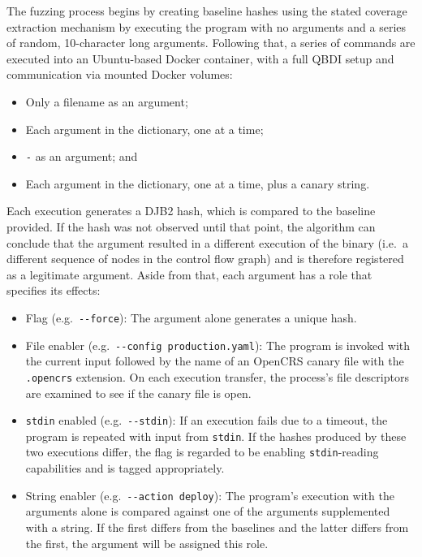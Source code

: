 \documentclass[../main.tex]{subfiles}
\begin{document}
The fuzzing process begins by creating baseline hashes using the stated
coverage extraction mechanism by executing the program with no arguments and a
series of random, 10-character long arguments. Following that, a series of
commands are executed into an Ubuntu-based Docker container, with a full QBDI
setup and communication via mounted Docker volumes:

\begin{itemize}
  \tightlist
  \item
        Only a filename as an argument;
  \item
        Each argument in the dictionary, one at a time;
  \item
        \texttt{-} as an argument; and
  \item
        Each argument in the dictionary, one at a time, plus a canary string.
\end{itemize}

Each execution generates a DJB2 hash, which is compared to the baseline
provided. If the hash was not observed until that point, the algorithm can
conclude that the argument resulted in a different execution of the binary
(i.e.~a different sequence of nodes in the control flow graph) and is therefore
registered as a legitimate argument. Aside from that, each argument has a role
that specifies its effects:

\begin{itemize}
  \tightlist
  \item
        Flag (e.g.~\texttt{-\/-force}): The argument alone generates a unique
        hash.
  \item
        File enabler (e.g.~\texttt{-\/-config\ production.yaml}): The program
        is invoked with the current input followed by the name of an OpenCRS
        canary file with the \texttt{.opencrs} extension. On each execution
        transfer, the process's file descriptors are examined to see if the
        canary file is open.
  \item
        \texttt{stdin} enabled (e.g.~\texttt{-\/-stdin}): If an execution
        fails due to a timeout, the program is repeated with input from
        \texttt{stdin}. If the hashes produced by these two executions differ,
        the flag is regarded to be enabling \texttt{stdin}-reading
        capabilities and is tagged appropriately.
  \item
        String enabler (e.g.~\texttt{-\/-action\ deploy}): The program's
        execution with the arguments alone is compared against one of the
        arguments supplemented with a string. If the first differs from the
        baselines and the latter differs from the first, the argument will be
        assigned this role.
\end{itemize}
\end{document}

